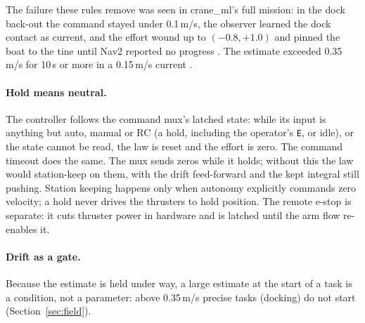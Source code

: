 \noindent The failure these rules remove was seen in crane\_ml's full mission: in the dock
back-out the command stayed under 0.1\,m/s, the observer learned the dock contact as current,
and the effort wound up to $(-0.8, +1.0)$ and pinned the boat to the tine until Nav2 reported
no progress . The estimate exceeded 0.35\,m/s for 10\,s or more in a
0.15\,m/s current .



\paragraph{Hold means neutral.} The controller follows the command mux's latched state: while
its input is anything but auto, manual or RC (a hold, including the operator's \texttt{E}, or idle),
or the state cannot be read, the law is reset and the effort is zero. The command timeout does
the same. The mux sends zeros while it holds; without this the law would station-keep on them,
with the drift feed-forward and the kept integral still pushing. Station
keeping happens only when autonomy explicitly commands zero velocity; a hold never drives the
thrusters to hold position. The remote e-stop is separate: it cuts thruster power in hardware
and is latched until the arm flow re-enables it.

\paragraph{Drift as a gate.} Because the estimate is held under way, a large estimate at the
start of a task is a condition, not a parameter: above 0.35\,m/s precise tasks (docking) do not
start (Section~\ref{sec:field}).
